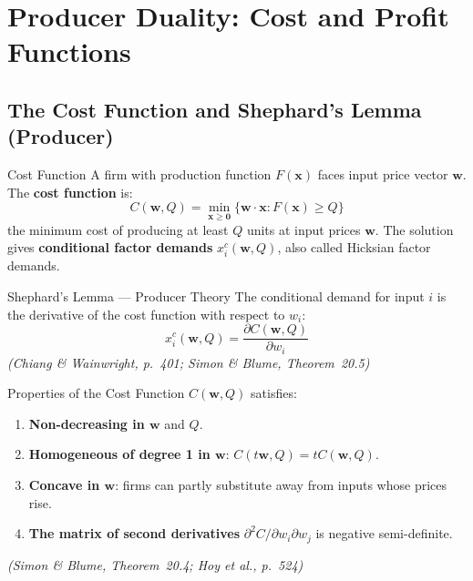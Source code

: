 \documentclass[12pt, a4paper]{article}
\theoremstyle{definition}
\newcommand{\bx}{\mathbf{x}}
\newcommand{\bz}{\mathbf{0}}
\newcommand{\pp}[2]{\dfrac{\partial #1}{\partial #2}}
\begin{document}
\section{Producer Duality: Cost and Profit Functions}

\subsection{The Cost Function and Shephard's Lemma (Producer)}

\begin{defbox}{Cost Function}
A firm with production function $F(\bx)$ faces input price vector $\mathbf{w}$.
The \textbf{cost function} is:
\[
  C(\mathbf{w}, Q) = \min_{\bx\geq\bz}\{\mathbf{w}\cdot\bx : F(\bx)\geq Q\}
\]
the minimum cost of producing at least $Q$ units at input prices $\mathbf{w}$.
The solution gives \textbf{conditional factor demands}
$x_i^c(\mathbf{w},Q)$, also called Hicksian factor demands.
\end{defbox}

\begin{thmbox}{Shephard's Lemma --- Producer Theory}
The conditional demand for input $i$ is the derivative of the cost function
with respect to $w_i$:
\[
  x_i^c(\mathbf{w},Q) = \pp{C(\mathbf{w},Q)}{w_i}
\]
\emph{(Chiang \& Wainwright, p.\ 401; Simon \& Blume, Theorem~20.5)}
\end{thmbox}

\begin{thmbox}{Properties of the Cost Function}
$C(\mathbf{w},Q)$ satisfies:
\begin{enumerate}
  \item \textbf{Non-decreasing in $\mathbf{w}$} and $Q$.
  \item \textbf{Homogeneous of degree 1 in $\mathbf{w}$}:
        $C(t\mathbf{w},Q) = tC(\mathbf{w},Q)$.
  \item \textbf{Concave in $\mathbf{w}$}: firms can partly substitute away
        from inputs whose prices rise.
  \item \textbf{The matrix of second derivatives} $\partial^2 C/\partial w_i\partial w_j$
        is negative semi-definite.
\end{enumerate}
\emph{(Simon \& Blume, Theorem~20.4; Hoy et al., p.\ 524)}
\end{thmbox}
\end{document}

